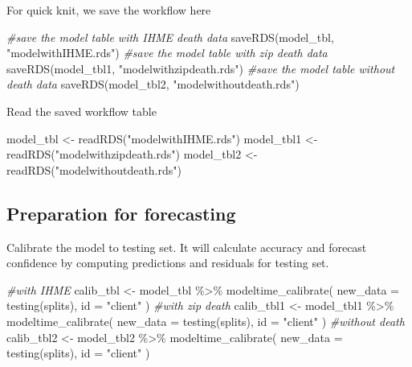 \documentclass[
]{article}
\newenvironment{Shaded}{\begin{snugshade}}{\end{snugshade}}
\newcommand{\AttributeTok}[1]{\textcolor[rgb]{0.77,0.63,0.00}{#1}}
\newcommand{\CommentTok}[1]{\textcolor[rgb]{0.56,0.35,0.01}{\textit{#1}}}
\newcommand{\FunctionTok}[1]{\textcolor[rgb]{0.00,0.00,0.00}{#1}}
\newcommand{\NormalTok}[1]{#1}
\newcommand{\OtherTok}[1]{\textcolor[rgb]{0.56,0.35,0.01}{#1}}
\newcommand{\SpecialCharTok}[1]{\textcolor[rgb]{0.00,0.00,0.00}{#1}}
\newcommand{\StringTok}[1]{\textcolor[rgb]{0.31,0.60,0.02}{#1}}
\begin{document}
For quick knit, we save the workflow here

\begin{Shaded}
\begin{Highlighting}[]
\CommentTok{\#save the model table with IHME death data}
\FunctionTok{saveRDS}\NormalTok{(model\_tbl, }\StringTok{"modelwithIHME.rds"}\NormalTok{)}
\CommentTok{\#save the model table with zip death data}
\FunctionTok{saveRDS}\NormalTok{(model\_tbl1, }\StringTok{"modelwithzipdeath.rds"}\NormalTok{)}
\CommentTok{\#save the model table without death data}
\FunctionTok{saveRDS}\NormalTok{(model\_tbl2, }\StringTok{"modelwithoutdeath.rds"}\NormalTok{)}
\end{Highlighting}
\end{Shaded}

Read the saved workflow table

\begin{Shaded}
\begin{Highlighting}[]
\NormalTok{model\_tbl }\OtherTok{\textless{}{-}} \FunctionTok{readRDS}\NormalTok{(}\StringTok{"modelwithIHME.rds"}\NormalTok{)}
\NormalTok{model\_tbl1 }\OtherTok{\textless{}{-}} \FunctionTok{readRDS}\NormalTok{(}\StringTok{"modelwithzipdeath.rds"}\NormalTok{)}
\NormalTok{model\_tbl2 }\OtherTok{\textless{}{-}} \FunctionTok{readRDS}\NormalTok{(}\StringTok{"modelwithoutdeath.rds"}\NormalTok{)}
\end{Highlighting}
\end{Shaded}

\hypertarget{preparation-for-forecasting}{%
\subsection{Preparation for
forecasting}\label{preparation-for-forecasting}}

Calibrate the model to testing set. It will calculate accuracy and
forecast confidence by computing predictions and residuals for testing
set.

\begin{Shaded}
\begin{Highlighting}[]
\CommentTok{\#with IHME}
\NormalTok{calib\_tbl }\OtherTok{\textless{}{-}}\NormalTok{ model\_tbl }\SpecialCharTok{\%\textgreater{}\%}
    \FunctionTok{modeltime\_calibrate}\NormalTok{(}
      \AttributeTok{new\_data =} \FunctionTok{testing}\NormalTok{(splits), }
      \AttributeTok{id       =} \StringTok{"client"}
\NormalTok{    )}
\CommentTok{\#with zip death}
\NormalTok{calib\_tbl1 }\OtherTok{\textless{}{-}}\NormalTok{ model\_tbl1 }\SpecialCharTok{\%\textgreater{}\%}
    \FunctionTok{modeltime\_calibrate}\NormalTok{(}
      \AttributeTok{new\_data =} \FunctionTok{testing}\NormalTok{(splits), }
      \AttributeTok{id       =} \StringTok{"client"}
\NormalTok{    )}
\CommentTok{\#without death}
\NormalTok{calib\_tbl2 }\OtherTok{\textless{}{-}}\NormalTok{ model\_tbl2 }\SpecialCharTok{\%\textgreater{}\%}
    \FunctionTok{modeltime\_calibrate}\NormalTok{(}
      \AttributeTok{new\_data =} \FunctionTok{testing}\NormalTok{(splits), }
      \AttributeTok{id       =} \StringTok{"client"}
\NormalTok{    )}
\end{Highlighting}
\end{Shaded}
\end{document}
